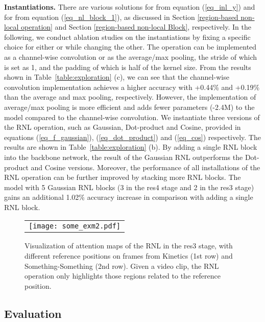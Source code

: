 \documentclass[a4paper,conference]{IEEEtran}
\begin{document}
\noindent \textbf{Instantiations.} There are various solutions for  from equation (\ref{eq_inl_y}) and for  from equation (\ref{eq_nl_block_1}), as discussed in Section \ref{region-based non-local operation} and Section \ref{region-based non-local Block}, respectively. In the following, we conduct ablation studies on the instantiations by fixing a specific choice for either  or  while changing the other. The operation  can be implemented as a channel-wise convolution or as the average/max pooling, the stride of which is set as 1, and the padding of which is half of the kernel size. From the results shown in Table~\ref{table:exploration} (c), we can see that the channel-wise convolution implementation achieves a higher accuracy with +0.44\% and  +0.19\% than the average and max pooling, respectively. However, the implementation of average/max pooling is more efficient and adds fewer parameters (-2.4M) to the model compared to the channel-wise convolution. We instantiate three versions of the RNL operation, such as Gaussian, Dot-product and Cosine, provided in equations (\ref{eq_f_gaussian}), (\ref{eq_dot_product}) and (\ref{eq_cos}) respectively. The results are shown in Table~\ref{table:exploration} (b). By adding a single RNL block into the backbone network, the result of the Gaussian RNL outperforms the Dot-product and Cosine versions. Moreover, the performance of all installations of the RNL operation can be further improved by stacking more RNL blocks. The model with 5 Gaussian RNL blocks (3 in the res4 stage and 2 in the res3 stage) gains an additional 1.02\% accuracy increase in comparison with adding a single RNL block.

 \begin{figure*}
  \centering
  \begin{tabular}{c}
    \texttt{[image: some\_exm2.pdf]}
  \end{tabular}
 
  \caption{Visualization of attention maps of the RNL in the res3 stage, with different reference positions on frames from Kinetics (1st row) and Something-Something (2nd row). Given a video clip,  the RNL operation only highlights those regions related to the reference position.}
\label{fig:example_nl_some}
\end{figure*}



\subsection{Evaluation}
\end{document}
